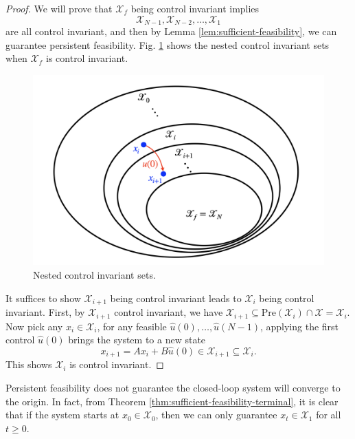 \documentclass[
]{book}
\theoremstyle{definition}
\theoremstyle{definition}
\theoremstyle{definition}
\theoremstyle{definition}
\theoremstyle{remark}
\begin{document}
\begin{proof}
We will prove that \(\mathcal{X}_f\) being control invariant implies
\[
\mathcal{X}_{N-1}, \mathcal{X}_{N-2},\dots,\mathcal{X}_1
\]
are all control invariant, and then by Lemma \ref{lem:sufficient-feasibility}, we can guarantee persistent feasibility. Fig. \ref{fig:mpc-nested-control-invariant-set} shows the nested control invariant sets when \(\mathcal{X}_f\) is control invariant.

\begin{figure}

{\centering \includegraphics[width=0.8\linewidth]{images/mpc_nested_control_invariant_set} 

}

\caption{Nested control invariant sets.}\label{fig:mpc-nested-control-invariant-set}
\end{figure}

It suffices to show \(\mathcal{X}_{i+1}\) being control invariant leads to \(\mathcal{X}_i\) being control invariant. First, by \(\mathcal{X}_{i+1}\) control invariant, we have \(\mathcal{X}_{i+1} \subseteq \text{Pre}(\mathcal{X}_i) \cap \mathcal{X} = \mathcal{X}_i\). Now pick any \(x_{i} \in \mathcal{X}_{i}\), for any feasible \(\hat{u}(0),\dots,\hat{u}(N-1)\), applying the first control \(\hat{u}(0)\) brings the system to a new state
\[
x_{i+1} = A x_i + B \hat{u}(0) \in \mathcal{X}_{i+1} \subseteq \mathcal{X}_i.
\]
This shows \(\mathcal{X}_i\) is control invariant.
\end{proof}

Persistent feasibility does not guarantee the closed-loop system will converge to the origin. In fact, from Theorem \ref{thm:sufficient-feasibility-terminal}, it is clear that if the system starts at \(x_0 \in \mathcal{X}_0\), then we can only guarantee \(x_t \in \mathcal{X}_1\) for all \(t \geq 0\).
\end{document}
